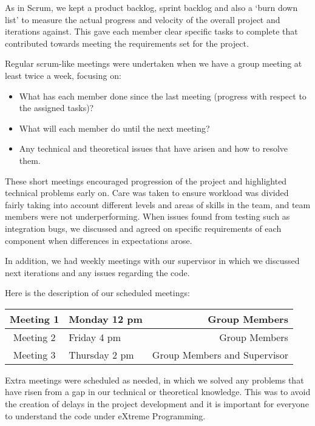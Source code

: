 As in Scrum, we kept a product backlog, sprint backlog and also a `burn down list' to measure the actual progress and velocity of the overall project and iterations against. This gave each member clear specific tasks to complete that contributed towards meeting the requirements set for the project.

Regular scrum-like meetings were undertaken when we have a group meeting at least twice a week, focusing on:

\begin{itemize}
\item What has each member done since the last meeting (progress with respect to the assigned tasks)?
\item What will each member do until the next meeting?
\item Any technical and theoretical issues that have arisen and how to resolve them.
\end{itemize}

These short meetings encouraged progression of the project and highlighted technical problems early on. Care was taken to ensure workload was divided fairly taking into account different levels and areas of skills in the team, and team members were not underperforming. When issues found from testing such as integration bugs, we discussed and agreed on specific requirements of each component when differences in expectations arose.

In addition, we had weekly meetings with our supervisor in which we discussed next iterations and any issues regarding the code.

Here is the description of our scheduled meetings:
\begin{center}
\begin{tabular}{| c | l | r |}
\hline
Meeting 1 & Monday 12 pm & Group Members \\ \hline
Meeting 2 & Friday 4 pm & Group Members \\ \hline
Meeting 3 & Thursday 2 pm & Group Members and Supervisor \\ 
\hline
\end{tabular}
\end{center}

Extra meetings were scheduled as needed, in which we solved any problems that have risen from a gap in our technical or theoretical knowledge. This was to avoid the creation of delays in the project development and it is important for everyone to understand the code under eXtreme Programming.

